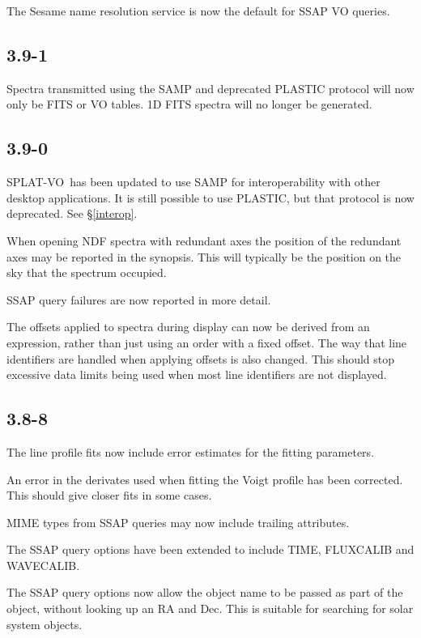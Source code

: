 \documentclass[twoside,11pt]{article}
\renewcommand{\_}{\texttt{\symbol{95}}}
\newcommand{\SPLAT}{\textsf{SPLAT-VO}}
\begin{document}
The Sesame name resolution service is now the default for SSAP VO queries.

\subsection{3.9-1}

Spectra transmitted using the SAMP and deprecated PLASTIC protocol will now
only be FITS or VO tables. 1D FITS spectra will no longer be generated.

\subsection{3.9-0}

\SPLAT\ has been updated to use SAMP for interoperability with other
desktop applications. It is still possible to use PLASTIC, but that
protocol is now deprecated.
See \S\ref{interop}.

When opening NDF spectra with redundant axes the position of the
redundant axes may be reported in the synopsis. This will typically
be the position on the sky that the spectrum occupied.

SSAP query failures are now reported in more detail.

The offsets applied to spectra during display can now be derived from an
expression, rather than just using an order with a fixed offset. The
way that line identifiers are handled when applying offsets is also
changed. This should stop excessive data limits being used when most
line identifiers are not displayed.

\subsection{3.8-8}

The line profile fits now include error estimates for the fitting parameters.

An error in the derivates used when fitting the Voigt profile has been
corrected. This should give closer fits in some cases.

MIME types from SSAP queries may now include trailing attributes.

The SSAP query options have been extended to include TIME, FLUXCALIB
and WAVECALIB.

The SSAP query options now allow the object name to be passed as part
of the object, without looking up an RA and Dec. This is suitable
for searching for solar system objects.
\end{document}
